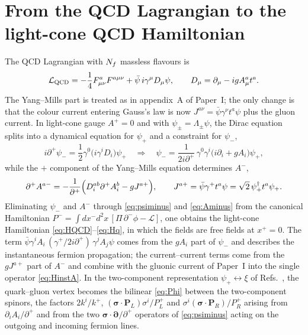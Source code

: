 \section{From the QCD Lagrangian to the light-cone QCD Hamiltonian}
\label{app:hamiltonian}

The QCD Lagrangian with $N_{f}$ massless flavours is
\begin{equation}
\mathcal L_{\rm QCD}=-\frac14F^{a}_{\mu\nu}F^{a\mu\nu}+\bar\psi\,i\gamma^{\mu}D_{\mu}\psi,
\qquad D_{\mu}=\partial_{\mu}-igA^{a}_{\mu}t^{a}.
\label{eq:LQCD}
\end{equation}
The Yang--Mills part is treated as in appendix~A of Paper~I; the only change is that the colour
current entering Gauss's law is now $J^{a\nu}=\bar\psi\gamma^{\nu}t^{a}\psi$ plus the gluon
current. In light-cone gauge $A^{+}=0$ and with $\psi_{\pm}=\Lambda_{\pm}\psi$, the Dirac equation
splits into a dynamical equation for $\psi_{+}$ and a constraint for $\psi_{-}$,
\begin{equation}
i\partial^{+}\psi_{-}=\frac12\gamma^{0}\big(i\gamma^{i}D_{i}\big)\psi_{+}
\quad\Rightarrow\quad
\psi_{-}=\frac{1}{2i\partial^{+}}\,\gamma^{0}\gamma^{i}\big(i\partial_{i}+gA_{i}\big)\psi_{+},
\label{eq:psiminus}
\end{equation}
while the $+$ component of the Yang--Mills equation determines $A^{-}$,
\begin{equation}
\partial^{+}A^{a-}=-\frac{1}{\partial^{+}}\Big(D^{ab}_{i}\partial^{+}A^{b}_{i}-gJ^{a+}\Big),
\qquad J^{a+}=\bar\psi\gamma^{+}t^{a}\psi=\sqrt2\,\psi_{+}^{\dagger}t^{a}\psi_{+}.
\label{eq:Aminus}
\end{equation}
Eliminating $\psi_{-}$ and $A^{-}$ through \eqref{eq:psiminus} and \eqref{eq:Aminus} from the
canonical Hamiltonian $P^{-}=\int dx^{-}d^{2}x\,[\Pi\,\partial^{-}\phi-\mathcal L]$, one obtains
\cite{Brodsky:1997de,Zhang:1993dd,Kogut:1969xa} the light-cone Hamiltonian
\eqref{eq:HQCD}--\eqref{eq:Hq}, in which the fields are free fields at $x^{+}=0$. The term
$\bar\psi\gamma^{i}A_{i}\,(\gamma^{+}/2i\partial^{+})\,\gamma^{j}A_{j}\psi$ comes from the
$gA_{i}$ part of $\psi_{-}$ and describes the instantaneous fermion propagation; the current--current
terms come from the $gJ^{a+}$ part of $A^{-}$ and combine with the gluonic current of Paper~I into
the single operator \eqref{eq:HinstA}. In the two-component representation
$\psi_{+}\leftrightarrow\xi$ of Refs.~\cite{Zhang:1993dd,Brodsky:1997de}, the quark--gluon vertex
becomes the bilinear \eqref{eq:Phi} between the two-component spinors, the factors $2k^{i}/k^{+}$,
$(\bm\sigma\!\cdot\!\bm P_{L})\sigma^{i}/P^{+}_{L}$ and $\sigma^{i}(\bm\sigma\!\cdot\!\bm P_{R})/P^{+}_{R}$
arising from $\partial_{i}A_{i}/\partial^{+}$ and from the two $\bm\sigma\!\cdot\!\bm\partial/\partial^{+}$
operators of \eqref{eq:psiminus} acting on the outgoing and incoming fermion lines.

